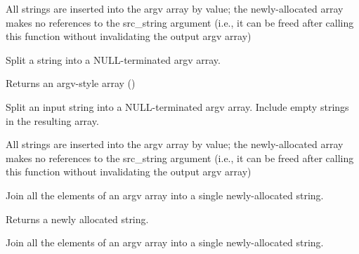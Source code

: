 \adviceuserstart
All strings are inserted into the argv array by value; the newly-allocated array makes no references to the src_string argument (i.e., it can be freed after calling this function without invalidating the output argv array)
\adviceuserend


Split a string into a NULL-terminated argv array.


\begin{arglist}
\end{arglist}

Returns an argv-style array ()

\descr
Split an input string into a NULL-terminated argv array. Include empty strings in the resulting array.

\adviceuserstart
All strings are inserted into the argv array by value; the newly-allocated array makes no references to the src_string argument (i.e., it can be freed after calling this function without invalidating the output argv array)
\adviceuserend


Join all the elements of an argv array into a single newly-allocated string.


\begin{arglist}
\end{arglist}

Returns a newly allocated string.

\descr
Join all the elements of an argv array into a single newly-allocated string.


